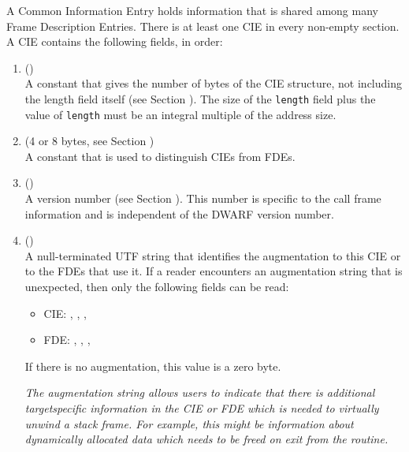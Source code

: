 A Common Information Entry holds information that is shared
among many Frame Description Entries. There is at least one
CIE in every non-empty \dotdebugframe{} section. A CIE contains
the following fields, in order:
\begin{enumerate}[1. ]
\item \HFNlength{} ()  \\
A constant that gives the number of bytes of the CIE structure,
not including the length field itself 
(see Section ). 
The
size of the \texttt{length} field plus the value of \texttt{length} must be an
integral multiple of the address size.

\item  \HFNCIEid{} (4 or 8 bytes, see Section ) \\
A constant that is used to distinguish CIEs from FDEs.

\item  \HFNversion{} (\HFTubyte) \\
A version number 
(see Section ). 
This number is specific to the call frame information
and is independent of the DWARF version number.

\item  \HFNaugmentation{} (\HFTaugstring) \\
A null-terminated UTF string that identifies the augmentation
to this CIE or to the FDEs that use it. If a reader encounters
an augmentation string that is unexpected, then only the
following fields can be read:


\begin{itemize}

\item CIE: \HFNlength, \HFNCIEid, \HFNversion, \HFNaugmentation

\item FDE: \HFNlength, \HFNCIEpointer, \HFNinitiallocation, \HFNaddressrange

\end{itemize}
If there is no augmentation, this value is a zero byte.

\textit{The augmentation string allows users to indicate that there
is additional target\dash specific information in the CIE or FDE
which is needed to virtually 
unwind a stack frame. For example, this
might be information about dynamically allocated data which
needs to be freed on exit from the routine.}


\end{enumerate}

